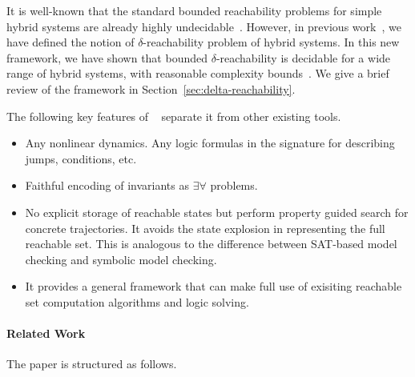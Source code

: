 It is well-known that the standard bounded reachability problems for
simple hybrid systems are already highly
undecidable~\cite{DBLP:conf/rex/AlurD91,DBLP:conf/hybrid/AlurCHH92}. However, in
previous work~\cite{}, we have defined the notion of
$\delta$-reachability problem of hybrid systems. In this new
framework, we have shown that bounded $\delta$-reachability is
decidable for a wide range of hybrid systems, with reasonable
complexity bounds~\cite{}. We give a brief review of the framework in
Section~\ref{sec:delta-reachability}.

The following key features of ~\dReach{} separate it from other existing tools. 
\begin{itemize}
\item Any nonlinear dynamics. Any logic formulas in the signature for describing jumps, conditions, etc. 
\item Faithful encoding of invariants as $\exists\forall$ problems. 
\item No explicit storage of reachable states but perform property guided search for concrete trajectories.
It avoids the state explosion in representing the full reachable set. This is analogous to the difference between SAT-based 
model checking and symbolic model checking.  
\item It provides a general framework that can make full use of exisiting reachable set computation algorithms and logic solving.  
\end{itemize}

\paragraph{Related Work}

The paper is structured as follows.


